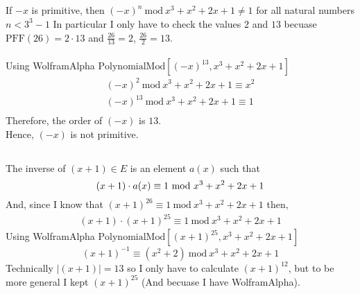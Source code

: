 \documentclass{article}
\begin{document}
\subsection{}
If $-x$ is primitive, then $(-x)^n\ \textrm{mod}\ x^3 + x^2 + 2x + 1 \ne 1$
for all natural numbers $n < 3^3-1$
\newline
\newline
In particular I only have to check the values $2$ and $13$ becuase
$\textrm{PFF}(26) = 2 \cdot 13$ and $\frac{26}{13} = 2$, $\frac{26}{2} = 13$.
\\
\\
Using WolframAlpha $\textrm{PolynomialMod}[(-x)^{13}, {x^3 + x^2 + 2x + 1}]$
\[
\begin{split}
(-x)^{2}\ \textrm{mod}\ x^3 + x^2 + 2x + 1 \equiv x^2 \\
(-x)^{13}\ \textrm{mod}\ x^3 + x^2 + 2x + 1 \equiv 1 \\
\end{split}
\]
Therefore, the order of $(-x)$ is $13$. \\
Hence, $(-x)$ is not primitive.
\subsection{}
The inverse of $(x+1) \in E$ is an element $a(x)$ such that
\[
(x+1) \cdot a(x) \equiv 1\ \textrm{mod}\ x^3 + x^2 + 2x + 1 \\
\]
And, since I know that $(x + 1)^{26} \equiv 1\ \textrm{mod}\ x^3+x^2+2x+1$ then,
\[
\begin{split}
(x+1) \cdot (x+1)^{25} \equiv 1\ \textrm{mod}\ x^3+x^2+2x+1
\end{split}
\]
Using WolframAlpha $\textrm{PolynomialMod}[(x+1)^{25}, {x^3+x^2+2x+1}]$
\[
(x+1)^{-1} \equiv (x^2 + 2)\ \textrm{mod}\ x^3+x^2+2x+1
\]
Technically $|(x+1)| = 13$ so I only have to calculate $(x+1)^{12}$,
but to be more general I kept $(x+1)^{25}$ (And becuase I have WolframAlpha).

\end{document}
